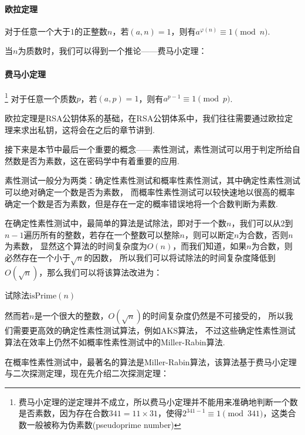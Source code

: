 \documentclass{book}
\numberwithin{equation}{subsubsection}
\begin{document}
\paragraph{\textbf{欧拉定理}}
对于任意一个大于$1$的正整数$n$，若$(a,n)=1$，则有$a^{\varphi(n)}\equiv 1\pmod{n}$.\par
当$n$为质数时，我们可以得到一个推论——费马小定理：
\paragraph{\textbf{费马小定理}}\footnote{费马小定理的逆定理并不成立，所以费马小定理并不能用来准确地判断一个数是否素数，因为存在合数$341=11\times31$，使得$2^{341-1}\equiv 1\pmod{341}$，这类合数一般被称为伪素数(pseudoprime number)}
对于任意一个质数$p$，若$(a,p)=1$，则有$a^{p-1}\equiv 1\pmod{p}$.\par
欧拉定理是RSA公钥体系的基础，在RSA公钥体系中，我们往往需要通过欧拉定理来求出私钥，这将会在之后的章节讲到.\par
接下来是本节中最后一个重要的概念——素性测试，素性测试可以用于判定所给自然数是否为素数，这在密码学中有着重要的应用.\par
素性测试一般分为两类：确定性素性测试和概率性素性测试，其中确定性素性测试可以绝对确定一个数是否为素数，
而概率性素性测试可以较快速地以很高的概率确定一个数是否为素数，但是存在一定的概率错误地将一个合数判断为素数.\par
在确定性素性测试中，最简单的算法是试除法，即对于一个数$n$，我们可以从$2$到$n-1$遍历所有的整数，若存在一个整数可以整除$n$，则可以断定$n$为合数，否则$n$为素数，
显然这个算法的时间复杂度为$O(n)$，而我们知道，如果$n$为合数，则必然存在一个小于$\sqrt{n}$的因数，
所以我们可以将试除法的时间复杂度降低到$O(\sqrt{n})$，那么我们可以将该算法改进为：
\begin{algorithm}
    \caption{试除法$\text{isPrime}(n)$}
\end{algorithm}\par
然而若$n$是一个很大的整数，$O(\sqrt{n})$的时间复杂度仍然是不可接受的，
所以我们需要更高效的确定性素性测试算法，例如AKS算法，
不过这些确定性素性测试算法在效率上仍然不如概率性素性测试中的Miller-Rabin算法.\par
在概率性素性测试中，最著名的算法是Miller-Rabin算法，该算法基于费马小定理与二次探测定理，现在先介绍二次探测定理：
\end{document}
